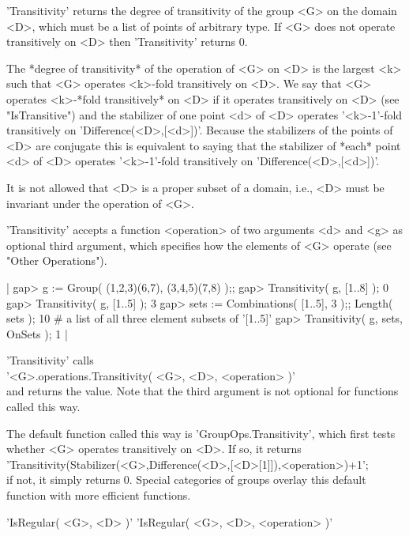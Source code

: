 'Transitivity' returns the degree of transitivity of the group <G> on the
domain  <D>, which must be a  list of points  of  arbitrary type.  If <G>
does not operate transitively on <D> then 'Transitivity' returns 0.

The  *degree of  transitivity*  of the operation of    <G> on <D> is  the
largest <k> such that <G> operates <k>-fold  transitively on <D>.  We say
that  <G>   operates  <k>-*fold   transitively*  on <D>   if it  operates
transitively on <D> (see "IsTransitive") and  the stabilizer of one point
<d> of <D> operates '<k>-1'-fold transitively on 'Difference(<D>,[<d>])'.
Because the stabilizers   of the  points  of  <D> are conjugate  this  is
equivalent to  saying  that the stabilizer  of  *each* point  <d>  of <D>
operates '<k>-1'-fold transitively on 'Difference(<D>,[<d>])'.

It is not allowed that <D> is a proper subset of a domain, i.e., <D> must
be invariant under the operation of <G>.

'Transitivity'  accepts a function <operation>  of two  arguments <d> and
<g>  as optional third argument, which  specifies how the elements of <G>
operate (see "Other Operations").

|    gap> g := Group( (1,2,3)(6,7), (3,4,5)(7,8) );;
    gap> Transitivity( g, [1..8] );
    0
    gap> Transitivity( g, [1..5] );
    3
    gap> sets := Combinations( [1..5], 3 );;  Length( sets );
    10    # a list of all three element subsets of '[1..5]'
    gap> Transitivity( g, sets, OnSets );
    1 |

'Transitivity' calls \\
'<G>.operations.Transitivity( <G>, <D>, <operation> )' \\
and returns the value.  Note that the third argument is not  optional for
functions called this way.

The  default function called  this way is  'GroupOps.Transitivity', which
first tests whether <G> operates transitively on <D>.  If so, it returns \\
'Transitivity(Stabilizer(<G>,Difference(<D>,[<D>[1]]),<operation>)+1'; \\
if not, it simply returns 0.  Special  categories of groups  overlay this
default function with more efficient functions.


'IsRegular( <G>, <D> )'
'IsRegular( <G>, <D>, <operation> )'

